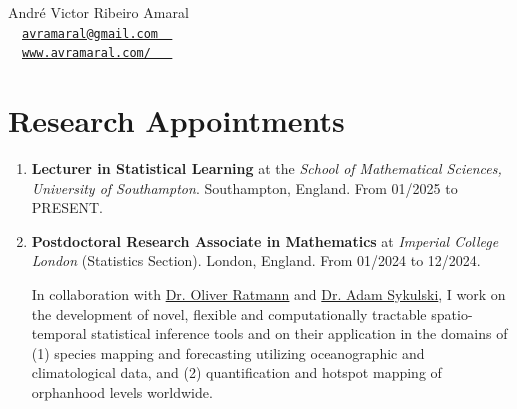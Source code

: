 \documentclass[10pt, ]{article}
\begin{document}
	
	\begin{center}
		{\LARGE André Victor Ribeiro Amaral} \\ \vspace{3pt}
		{\small\faEnvelope~~\href{mailto:avramaral@gmail.com}{\texttt{avramaral@gmail.com~~}}} \\
		{\small\faDesktop~~\href{https://www.avramaral.com/}{\texttt{www.avramaral.com/~~~}}}	%
	\end{center}
	
	\vspace{-12pt}
	\section*{Research Appointments} \vspace{-5pt}
	
	\begin{enumerate}[noitemsep, topsep=0pt]
		\item \textbf{Lecturer in Statistical Learning} at the \textit{School of Mathematical Sciences, University of Southampton}. Southampton, England. From 01/2025 to PRESENT.  \vspace{3pt}
		
		\item \textbf{Postdoctoral Research Associate in Mathematics} at \textit{Imperial College London} (Statistics Section). London, England. From 01/2024 to 12/2024. \vspace{3pt}
		
		In collaboration with \href{https://www.imperial.ac.uk/people/oliver.ratmann05}{Dr. Oliver Ratmann} and \href{https://www.imperial.ac.uk/people/adam.sykulski}{Dr. Adam Sykulski}, I work on the development of novel, flexible and computationally tractable spatio-temporal statistical inference tools and on their application in the domains of (1) species mapping and forecasting utilizing oceanographic and climatological data, and (2) quantification and hotspot mapping of orphanhood levels worldwide.
		
	\end{enumerate}
	
	\vspace{10pt}
	
	\vspace{-12pt}
\end{document}

